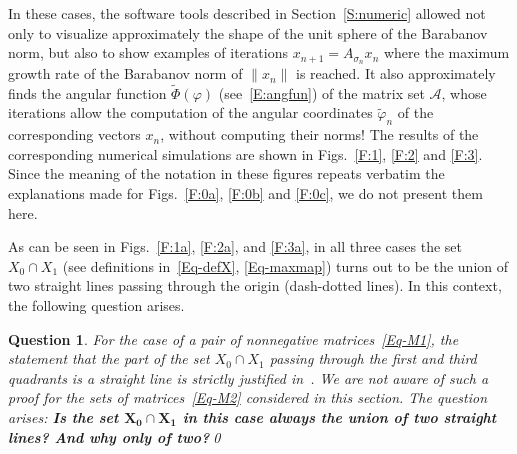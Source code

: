 \documentclass[a4paper,10pt,reqno]{amsart}
\let\cite\citep
\newtheorem{question}{Question}
\newcommand{\setA}{\mathscr{A}}
\begin{document}
In these cases, the software tools described in Section~\ref{S:numeric}
allowed not only to visualize approximately the shape of the unit sphere of
the Barabanov norm, but also to show examples of iterations
$x_{n+1}=A_{\sigma_{n}}x_{n}$ where the maximum growth rate of the Barabanov
norm of $\|x_{n}\|$ is reached. It also approximately finds the angular
function $\tilde{\varPhi}(\varphi)$ (see~\eqref{E:angfun}) of the matrix set
$\setA$, whose iterations allow the computation of the angular coordinates
$\tilde{\varphi}_{n}$ of the corresponding vectors $x_{n}$, without computing
their norms! The results of the corresponding numerical simulations are shown
in Figs.~\ref{F:1}, \ref{F:2} and \ref{F:3}. Since the meaning of the
notation in these figures repeats verbatim the explanations made for
Figs.~\ref{F:0a}, \ref{F:0b} and \ref{F:0c}, we do not present them here.

As can be seen in Figs.~\ref{F:1a}, \ref{F:2a}, and \ref{F:3a}, in all three
cases the set ${X_{0}\cap X_{1}}$ (see definitions in~\eqref{Eq-defX},
\eqref{Eq-maxmap}) turns out to be the union of two straight lines passing
through the origin (dash-dotted lines). In this context, the following question
arises.

\begin{question}\label{Q:1}\rm
For the case of a pair of nonnegative matrices~\eqref{Eq-M1}, the statement
that the part of the set $X_{0}\cap X_{1}$ passing through the first and
third quadrants is a straight line is strictly justified
in~\cite{Koz:INFOPROC05:e, Koz:INFOPROC06:e}. We are not aware of such a
proof for the sets of matrices~\eqref{Eq-M2} considered in this section. The
question arises: \textbf{Is the set $\boldsymbol{X_{0}\cap X_{1}}$ in this
case always the union of two straight lines? And why only of two?}\qed
\end{question}
\end{document}
